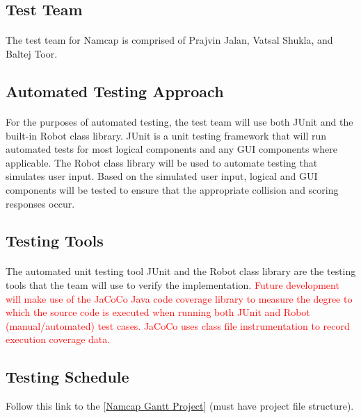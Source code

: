 \documentclass[12pt, titlepage]{article}
\begin{document}
\subsection{Test Team}
\paragraph{}
The test team for Namcap is comprised of Prajvin Jalan, Vatsal Shukla, and Baltej Toor.

\subsection{Automated Testing Approach}
\paragraph{}
For the purposes of automated testing, the test team will use both JUnit and the built-in Robot class library. JUnit is a unit testing framework that will run automated tests for most logical components and any GUI components where applicable. The Robot class library will be used to automate testing that simulates user input. Based on the simulated user input, logical and GUI components will be tested to ensure that the appropriate collision and scoring responses occur.

\subsection{Testing Tools}
\paragraph{}
The automated unit testing tool JUnit and the Robot class library are the testing tools that the team will use to verify the implementation. \textcolor{red}{Future development will make use of the JaCoCo Java code coverage library to measure the degree to which the source code is executed when running both JUnit and Robot (manual/automated) test cases. JaCoCo uses class file instrumentation to record execution coverage data.}

\subsection{Testing Schedule}
		
Follow this link to the [\href{run:../DevelopmentPlan/NamcapGanttProject.gan}{Namcap Gantt Project}] (must have project file structure).
\end{document}

